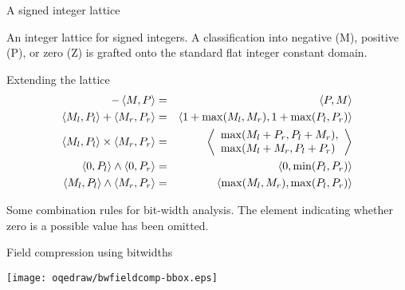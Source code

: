 \documentclass[%
pdf,
colorBG,
slideColor,
nototal,
oqe
]{prosper}
\begin{document}
\begin{slide}{A signed integer lattice}
\begin{center}
\renewcommand{\figscale}{0.6}%
\newcommand{\color}[2][rgb]{}%

\end{center}

\small
An integer lattice for signed integers. A classification into
negative (M), positive (P), or zero (Z) is grafted onto the standard
flat integer constant domain.
\end{slide}

\begin{slide}{Extending the lattice}
\begin{eqnarray*}
-\left\langle M,P \right\rangle &=& \left\langle P,M \right\rangle\\
\left\langle M_l,P_l \right\rangle + \left\langle M_r,P_r \right\rangle &=& \left\langle 1+\max(M_l,M_r),1+\max(P_l,P_r) \right\rangle\\
\left\langle M_l,P_l \right\rangle \times \left\langle M_r,P_r \right\rangle &=&
\left\langle \begin{array}{l}\max(M_l+P_r,P_l+M_r),\\
                       \max(M_l+M_r,P_l+P_r)\end{array} \right\rangle\\
\left\langle 0,P_l \right\rangle \wedge \left\langle 0,P_r \right\rangle &=& \left\langle 0,\min(P_l,P_r) \right\rangle\\
\left\langle M_l,P_l \right\rangle\wedge \left\langle M_r,P_r \right\rangle &=& \left\langle \max(M_l,M_r),\max(P_l,P_r) \right\rangle
\end{eqnarray*}

Some combination rules for bit-width analysis.  The 
element indicating whether zero is a possible value has been omitted.
\end{slide}

\begin{slide}{Field compression using bitwidths}

\begin{center}
\vspace{1cm}
\texttt{[image: oqedraw/bwfieldcomp-bbox.eps]}
\end{center}
\end{slide}
\end{document}
